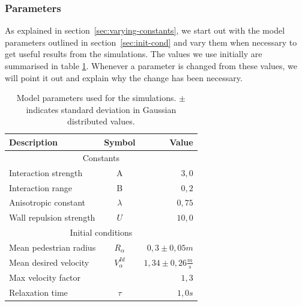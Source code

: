 \subsubsection{Parameters}
As explained in section~\ref{sec:varying-constants}, we start out with the 
model parameters outlined in section~\ref{sec:init-cond} and vary them when 
necessary to get useful results from the simulations.  The values we use 
initially are summarised in table \ref{tbl:parameter-settings}. Whenever a 
parameter is changed from these values, we will point it out and explain why 
the change has been necessary.

\begin{table}[ht]
    \begin{center}
        \begin{tabular}{l c r}
            \toprule
            \textbf{Description} & \textbf{Symbol} & \textbf{Value} \\
            \midrule
            \multicolumn{3}{c}{\textsf{Constants}}\\
            Interaction strength & A & $3,0$ \\
            Interaction range & B & $0,2$ \\
            Anisotropic constant & $\lambda$ & $0,75$ \\
            Wall repulsion strength & $U$ &  $10,0$ \\
            \midrule
            \multicolumn{3}{c}{\textsf{Initial conditions}}\\
            Mean pedestrian radius & $R_\alpha$ & $0,3 \pm 0,05 m$\\
            Mean desired velocity &  $V^{Id}_\alpha$ &  $1,34 \pm 0,26
            \frac{m}{s}$ \\
            Max velocity factor &  &  $1,3$ \\
            Relaxation time & $\tau$ & $1,0 s$\\
            \bottomrule
        \end{tabular}
        \caption[Model parameters]{Model parameters used for the simulations.  
        $\pm$ indicates standard deviation in Gaussian distributed values.}
        \label{tbl:parameter-settings}
    \end{center}
\end{table}

